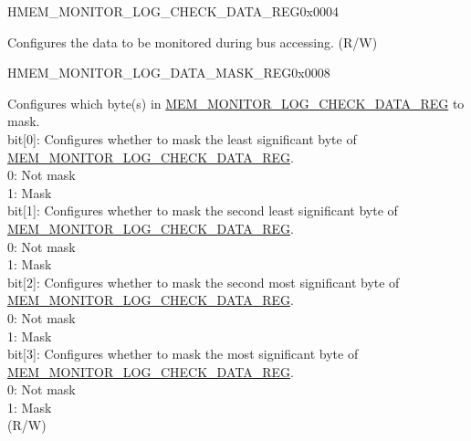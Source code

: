 \begin{register}{H}{MEM\_MONITOR\_LOG\_CHECK\_DATA\_REG}{0x0004}\label{regdesc:MEMMONITORLOGCHECKDATAREG}
%
\regnewline%
\begin{regdesc}\begin{reglist}
\label{fielddesc:MEMMONITORLOGCHECKDATA}\item [MEM\_MONITOR\_LOG\_CHECK\_DATA] Configures the data to be monitored during bus accessing.  (R/W)
\end{reglist}\end{regdesc}
\end{register}


\begin{register}{H}{MEM\_MONITOR\_LOG\_DATA\_MASK\_REG}{0x0008}\label{regdesc:MEMMONITORLOGDATAMASKREG}
%
%
\regnewline%
\begin{regdesc}\begin{reglist}\raggedright
\label{fielddesc:MEMMONITORLOGDATAMASK}\item[MEM\_MONITOR\_LOG\_DATA\_MASK] Configures which byte(s) in \hyperref[regdesc:MEMMONITORLOGCHECKDATAREG]{MEM\_MONITOR\_LOG\_CHECK\_DATA\_REG} to mask.\\
bit[0]: Configures whether to mask the least significant byte of  \hyperref[regdesc:MEMMONITORLOGCHECKDATAREG]{MEM\_MONITOR\_LOG\_CHECK\_DATA\_REG}.\\
0: Not mask \\
1: Mask\\
bit[1]: Configures whether to mask the second least significant byte of  \hyperref[regdesc:MEMMONITORLOGCHECKDATAREG]{MEM\_MONITOR\_LOG\_CHECK\_DATA\_REG}. \\
0: Not mask \\
1: Mask\\
bit[2]: Configures whether to mask the second most significant byte of  \hyperref[regdesc:MEMMONITORLOGCHECKDATAREG]{MEM\_MONITOR\_LOG\_CHECK\_DATA\_REG}. \\
0: Not mask \\
1: Mask\\
bit[3]: Configures whether to mask the most significant byte of  \hyperref[regdesc:MEMMONITORLOGCHECKDATAREG]{MEM\_MONITOR\_LOG\_CHECK\_DATA\_REG}. \\
0: Not mask \\
1: Mask\\
(R/W)
\end{reglist}\end{regdesc}
\end{register}


